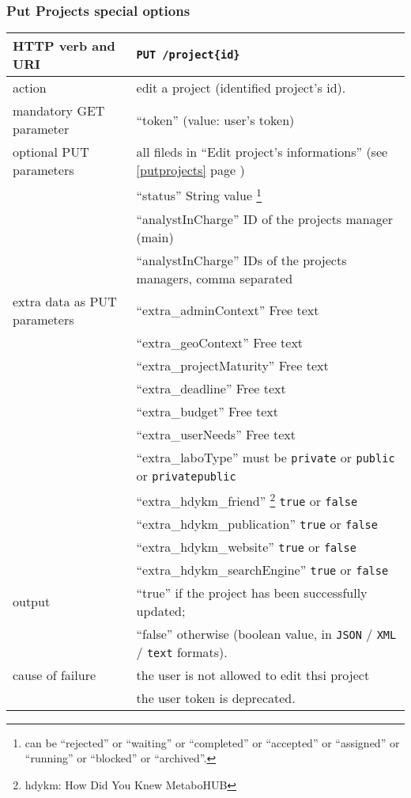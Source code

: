 \subsubsection{Put Projects special options}
\begin{tabular}{ | l | l | }
	\hline
	HTTP verb and URI & \texttt{PUT /project\{id\}} \\
	\hline
	action & edit a project (identified \via project's id). \\
	\hline
	mandatory GET parameter & ``token'' (value: user's token) \\
	\hline
	optional PUT parameters & all fileds in ``Edit project’s informations'' (see \ref{putprojects} page \pageref{putprojects}) \\		
	\space & ``status'' String value \footnote{can be ``rejected'' or ``waiting'' or ``completed'' or ``accepted'' or ``assigned'' or ``running'' or ``blocked'' or ``archived''. } \\
	\space & ``analystInCharge'' ID of the projects manager (main) \\
	\space & ``analystInCharge'' IDs of the projects managers, comma separated \\
	\hline
	extra data as PUT parameters & ``extra\_adminContext'' Free text \\
	\space & ``extra\_geoContext'' Free text \\	
	\space & ``extra\_projectMaturity'' Free text \\
	\space & ``extra\_deadline'' Free text \\
	\space & ``extra\_budget'' Free text \\
	\space & ``extra\_userNeeds'' Free text \\
	\space & ``extra\_laboType'' must be \texttt{private} or \texttt{public} or \texttt{privatepublic} \\
	\space & ``extra\_hdykm\_friend'' \footnote{hdykm: How Did You Knew MetaboHUB} \texttt{true} or \texttt{false} \\
	\space & ``extra\_hdykm\_publication'' \texttt{true} or \texttt{false} \\
	\space & ``extra\_hdykm\_website'' \texttt{true} or \texttt{false} \\
	\space & ``extra\_hdykm\_searchEngine'' \texttt{true} or \texttt{false} \\
	\hline
	output & ``true'' if the project has been successfully updated; \\
	\space & ``false'' otherwise (boolean value, in \texttt{JSON} / \texttt{XML} / \texttt{text} formats). \\
	\hline
	cause of failure &the user is not allowed to edit thsi project \\
	\space & the user token is deprecated. \\
	\hline
\end{tabular}
\newline


